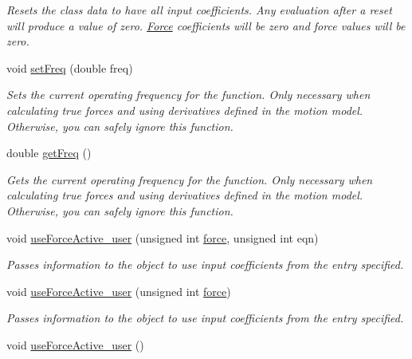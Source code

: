 \begin{DoxyCompactItemize}
\begin{DoxyCompactList}\small\item\em Resets the class data to have all input coefficients. Any evaluation after a reset will produce a value of zero. \hyperlink{classosea_1_1ofreq_1_1_force}{Force} coefficients will be zero and force values will be zero. \end{DoxyCompactList}\item 
void \hyperlink{classosea_1_1ofreq_1_1_motion_model_a18e880b4a0b1a1d1c385bc3be3524440}{set\-Freq} (double freq)
\begin{DoxyCompactList}\small\item\em Sets the current operating frequency for the function. Only necessary when calculating true forces and using derivatives defined in the motion model. Otherwise, you can safely ignore this function. \end{DoxyCompactList}\item 
double \hyperlink{classosea_1_1ofreq_1_1_motion_model_a3461ede3739b468b6bab3a05f94093cc}{get\-Freq} ()
\begin{DoxyCompactList}\small\item\em Gets the current operating frequency for the function. Only necessary when calculating true forces and using derivatives defined in the motion model. Otherwise, you can safely ignore this function. \end{DoxyCompactList}\item 
void \hyperlink{classosea_1_1ofreq_1_1_motion_model_aaf761fac4693612a10771e38993431a0}{use\-Force\-Active\-\_\-user} (unsigned int \hyperlink{input__syntax_8dox_ab0a92c70357da47fe86696522eab7dc8}{force}, unsigned int eqn)
\begin{DoxyCompactList}\small\item\em Passes information to the object to use input coefficients from the entry specified. \end{DoxyCompactList}\item 
void \hyperlink{classosea_1_1ofreq_1_1_motion_model_a6b402b9e9cfab05159732f38035434b5}{use\-Force\-Active\-\_\-user} (unsigned int \hyperlink{input__syntax_8dox_ab0a92c70357da47fe86696522eab7dc8}{force})
\begin{DoxyCompactList}\small\item\em Passes information to the object to use input coefficients from the entry specified. \end{DoxyCompactList}\item 
void \hyperlink{classosea_1_1ofreq_1_1_motion_model_a78243e9d9fd197b4675aad8b728de55e}{use\-Force\-Active\-\_\-user} ()

\end{DoxyCompactItemize}
